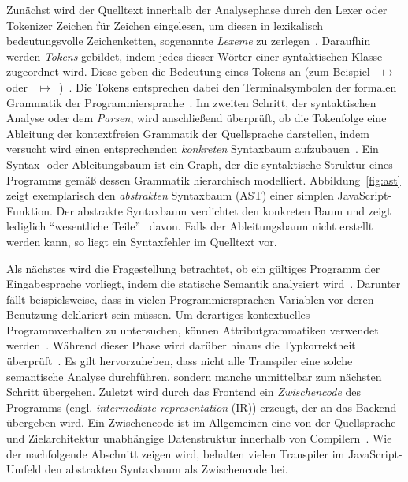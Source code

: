 Zunächst wird der Quelltext innerhalb der Analysephase durch den Lexer oder Tokenizer Zeichen für Zeichen eingelesen, um diesen in lexikalisch bedeutungsvolle Zeichenketten, sogenannte \emph{Lexeme} zu zerlegen~\autocite[43]{AHO:COMPILERS}. Daraufhin werden \emph{Tokens} gebildet, indem jedes dieser Wörter einer syntaktischen Klasse zugeordnet wird. Diese geben die Bedeutung eines Tokens an (zum Beispiel ~$\mapsto$~ oder \code{!=}~$\mapsto$~)~\autocite[26]{TORCZON:2007}. Die Tokens entsprechen dabei den Terminalsymbolen der formalen Grammatik der Programmiersprache~\autocite[43]{AHO:COMPILERS}.
Im zweiten Schritt, der syntaktischen Analyse oder dem \emph{Parsen}, wird anschließend überprüft, ob die Tokenfolge eine Ableitung der kontextfreien Grammatik der Quellsprache darstellen, indem versucht wird einen entsprechenden \emph{konkreten} Syntaxbaum aufzubauen~\autocite{SCHOEPP:COMPILER}. Ein Syntax- oder Ableitungsbaum ist ein Graph, der die syntaktische Struktur eines Programms gemäß dessen Grammatik hierarchisch modelliert. Abbildung~\ref{fig:ast} zeigt exemplarisch den \emph{abstrakten} Syntaxbaum (AST) einer simplen JavaScript-Funktion. Der abstrakte Syntaxbaum verdichtet den konkreten Baum und zeigt lediglich \enquote{wesentliche Teile}~\autocite[21]{WALDMANN:PPS} davon. Falls der Ableitungsbaum nicht erstellt werden kann, so liegt ein Syntaxfehler im Quelltext vor.

Als nächstes wird die Fragestellung betrachtet, ob ein gültiges Programm der Eingabesprache vorliegt, indem die statische Semantik analysiert wird~\autocite[8]{AHO:COMPILERS}. Darunter fällt beispielsweise, dass in vielen Programmiersprachen Variablen vor deren Benutzung deklariert sein müssen. Um derartiges kontextuelles Programmverhalten zu untersuchen, können Attributgrammatiken verwendet werden~\autocite[161]{TORCZON:2007}. Während dieser Phase wird darüber hinaus die Typkorrektheit überprüft~\autocite{SCHOEPP:COMPILER}. Es gilt hervorzuheben, dass nicht alle Transpiler eine solche semantische Analyse durchführen, sondern manche unmittelbar zum nächsten Schritt übergehen.
Zuletzt wird durch das Frontend ein \emph{Zwischencode} des Programms (engl. \textit{intermediate representation} (IR)) erzeugt, der an das Backend übergeben wird. Ein Zwischencode ist im Allgemeinen eine von der Quellsprache und Zielarchitektur unabhängige Datenstruktur innerhalb von Compilern~\autocite[6]{TORCZON:2007}. Wie der nachfolgende Abschnitt zeigen wird, behalten vielen Transpiler im JavaScript-Umfeld den abstrakten Syntaxbaum als Zwischencode bei.

